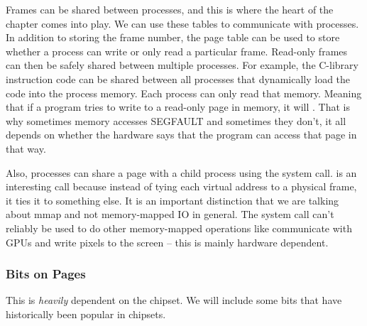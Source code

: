 Frames can be shared between processes, and this is where the heart of the chapter comes into play.
We can use these tables to communicate with processes.
In addition to storing the frame number, the page table can be used to store whether a process can write or only read a particular frame.
Read-only frames can then be safely shared between multiple processes.
For example, the C-library instruction code can be shared between all processes that dynamically load the code into the process memory.
Each process can only read that memory.
Meaning that if a program tries to write to a read-only page in memory, it will .
That is why sometimes memory accesses SEGFAULT and sometimes they don't, it all depends on whether the hardware says that the program can access that page in that way.
	 
Also, processes can share a page with a child process using the  system call.
 is an interesting call because instead of tying each virtual address to a physical frame, it ties it to something else. It is an important distinction that we are talking about mmap and not memory-mapped IO in general. The  system call can't reliably be used to do other memory-mapped operations like communicate with GPUs and write pixels to the screen -- this is mainly hardware dependent.
	 
\subsubsection{Bits on Pages}
	 
This is \textit{heavily} dependent on the chipset.
We will include some bits that have historically been popular in chipsets.
	 
